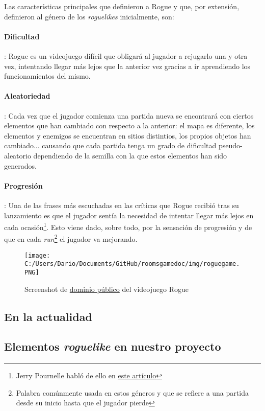 Las características principales que definieron a Rogue y que, por extensión, definieron al género de los \textit{roguelikes} inicialmente, son:

\paragraph{Dificultad}: Rogue es un videojuego difícil que obligará al jugador a rejugarlo una y otra vez, intentando llegar más lejos que la anterior vez gracias a ir aprendiendo los funcionamientos del mismo.

\paragraph{Aleatoriedad}: Cada vez que el jugador comienza una partida nueva se encontrará con ciertos elementos que han cambiado con respecto a la anterior: el mapa es diferente, los elementos y enemigos se encuentran en sitios distintios, los propios objetos han cambiado... causando que cada partida tenga un grado de dificultad pseudo-aleatorio dependiendo de la semilla con la que estos elementos han sido generados.

\paragraph{Progresión}: Una de las frases más escuchadas en las críticas que Rogue recibió tras su lanzamiento es que el jugador sentía la necesidad de intentar llegar más lejos en cada ocasión\footnote{Jerry Pournelle habló de ello en \href{http://goo.gl/Iz2qg6}{este artículo}}. Esto viene dado, sobre todo, por la sensación de progresión y de que en cada \textit{run}\footnote{Palabra comúnmente usada en estos géneros y que se refiere a una partida desde su inicio hasta que el jugador pierde} el jugador va mejorando.  

\begin{figure}[h!]
		\texttt{[image: C:/Users/Dario/Documents/GitHub/roomsgamedoc/img/roguegame.PNG]}
	\caption{Screenshot de \href{https://en.wikipedia.org/wiki/File:Rogue_Unix_Screenshot_CAR.PNG}{dominio público} del videojuego Rogue}
	\label{fig:roguegame}
\end{figure}

\subsection{En la actualidad}

\subsection{Elementos \textit{roguelike} en nuestro proyecto}